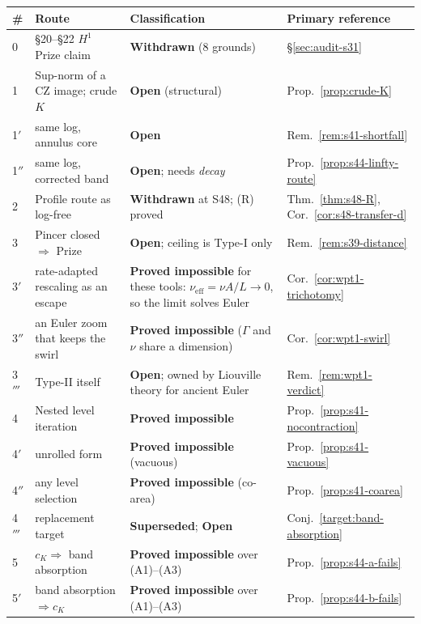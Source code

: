 \documentclass[11pt]{article}
\theoremstyle{definition}
\theoremstyle{remark}
\begin{document}
\begin{center}
\small
\begin{tabular}{@{}l p{} p{} l@{}}
\hline
\# & Route & Classification & Primary reference \\
\hline
0 & \S20--\S22 $H^1$ Prize claim & \textbf{Withdrawn} (8 grounds)
  & \S\ref{sec:audit-s31} \\
1 & Sup-norm of a CZ image; crude $K$
  & \textbf{Open} (structural) & Prop.~\ref{prop:crude-K} \\
1$'$ & \quad same log, annulus core & \textbf{Open}
  & Rem.~\ref{rem:s41-shortfall} \\
1$''$ & \quad same log, corrected band & \textbf{Open}; needs \emph{decay}
  & Prop.~\ref{prop:s44-linfty-route} \\
2 & Profile route as log-free & \textbf{Withdrawn} at S48; (R) proved
  & Thm.~\ref{thm:s48-R}, Cor.~\ref{cor:s48-transfer-d} \\
3 & Pincer closed $\Rightarrow$ Prize & \textbf{Open}; ceiling is Type-I only
  & Rem.~\ref{rem:s39-distance} \\
3$'$ & \quad rate-adapted rescaling as an escape
  & \textbf{Proved impossible} for these tools:
  $\nu_{\mathrm{eff}}=\nu A/L\to0$, so the limit solves Euler
  & Cor.~\ref{cor:wpt1-trichotomy} \\
3$''$ & \quad an Euler zoom that keeps the swirl
  & \textbf{Proved impossible} ($\Gamma$ and $\nu$ share a dimension)
  & Cor.~\ref{cor:wpt1-swirl} \\
3$'''$ & \quad Type-II itself & \textbf{Open}; owned by Liouville theory for
  ancient Euler & Rem.~\ref{rem:wpt1-verdict} \\
4 & Nested level iteration & \textbf{Proved impossible}
  & Prop.~\ref{prop:s41-nocontraction} \\
4$'$ & \quad unrolled form & \textbf{Proved impossible} (vacuous)
  & Prop.~\ref{prop:s41-vacuous} \\
4$''$ & \quad any level selection & \textbf{Proved impossible} (co-area)
  & Prop.~\ref{prop:s41-coarea} \\
4$'''$ & \quad replacement target & \textbf{Superseded}; \textbf{Open}
  & Conj.~\ref{target:band-absorption} \\
5 & $c_K\Rightarrow$ band absorption & \textbf{Proved impossible} over (A1)--(A3)
  & Prop.~\ref{prop:s44-a-fails} \\
5$'$ & band absorption $\Rightarrow c_K$ & \textbf{Proved impossible} over (A1)--(A3)
  & Prop.~\ref{prop:s44-b-fails} \\

\end{tabular}
\end{center}
\end{document}
